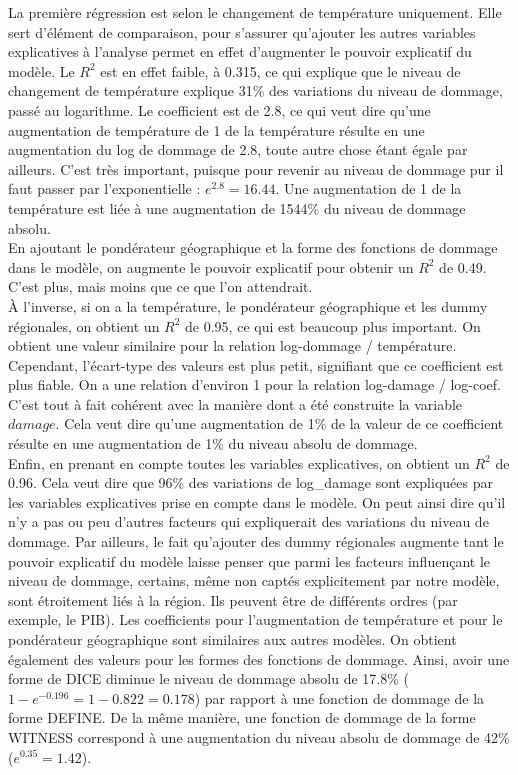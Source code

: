 La première régression est selon le changement de température uniquement. Elle sert d'élément de comparaison, pour s'assurer qu'ajouter les autres variables explicatives à l'analyse permet en effet d'augmenter le pouvoir explicatif du modèle. Le $R^2$ est en effet faible, à 0.315, ce qui explique que le niveau de changement de température explique 31\% des variations du niveau de dommage, passé au logarithme. Le coefficient est de 2.8, ce qui veut dire qu'une augmentation de température de 1 \textdegree de la température résulte en une augmentation du log de dommage de 2.8, toute autre chose étant égale par ailleurs. C'est très important, puisque pour revenir au niveau de dommage pur il faut passer par l'exponentielle : $e^{2.8}=16.44$. Une augmentation de 1 \textdegree de la température est liée à une augmentation de 1544\% du niveau de dommage absolu. \\



En ajoutant le pondérateur géographique et la forme des fonctions de dommage dans le modèle, on augmente le pouvoir explicatif pour obtenir un $R^2$ de 0.49. C'est plus, mais moins que ce que l'on attendrait. \\

À l'inverse, si on a la température, le pondérateur géographique et les dummy régionales, on obtient un $R^2$ de 0.95, ce qui est beaucoup plus important. On obtient une valeur similaire pour la relation log-dommage / température. Cependant, l'écart-type des valeurs est plus petit, signifiant que ce coefficient est plus fiable. On a une relation d'environ 1 pour la relation log-damage / log-coef. C'est tout à fait cohérent avec la manière dont a été construite la variable $damage$. Cela veut dire qu'une augmentation de 1\% de la valeur de ce coefficient résulte en une augmentation de 1\% du niveau absolu de dommage. \\


Enfin, en prenant en compte toutes les variables explicatives, on obtient un $R^2$ de 0.96. Cela veut dire que 96\% des variations de log\_damage sont expliquées par les variables explicatives prise en compte dans le modèle. On peut ainsi dire qu'il n'y a pas ou peu d'autres facteurs qui expliquerait des variations du niveau de dommage. Par ailleurs, le fait qu'ajouter des dummy régionales augmente tant le pouvoir explicatif du modèle laisse penser que parmi les facteurs influençant le niveau de dommage, certains, même non captés explicitement par notre modèle, sont étroitement liés à la région. Ils peuvent être de différents ordres (par exemple, le PIB). Les coefficients pour l'augmentation de température et pour le pondérateur géographique sont similaires aux autres modèles. On obtient également des valeurs pour les formes des fonctions de dommage. Ainsi, avoir une forme de DICE diminue le niveau de dommage absolu de 17.8\% ($1 - e^{-0.196}= 1 - 0.822 = 0.178$) par rapport à une fonction de dommage de la forme DEFINE. De la même manière, une fonction de dommage de la forme WITNESS correspond à une augmentation du niveau absolu de dommage de 42\% ($ e^{0.35} = 1.42$). \\

